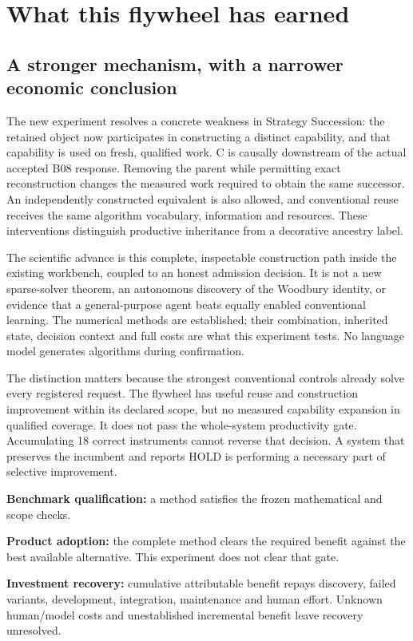 \section{What this flywheel has earned}
\label{sec:discussion}

\subsection{A stronger mechanism, with a narrower economic conclusion}

The new experiment resolves a concrete weakness in Strategy Succession: the retained object now participates
in constructing a distinct capability, and that capability is used on fresh, qualified work. C is causally
downstream of the actual accepted B08 response. Removing the parent while permitting exact reconstruction
changes the measured work required to obtain the same successor. An independently constructed equivalent
is also allowed, and conventional reuse receives the same algorithm vocabulary, information and resources.
These interventions distinguish productive inheritance from a decorative ancestry label.

The scientific advance is this complete, inspectable construction path inside the existing workbench, coupled
to an honest admission decision. It is not a new sparse-solver theorem, an autonomous discovery of the
Woodbury identity, or evidence that a general-purpose agent beats equally enabled conventional learning.
The numerical methods are established; their combination, inherited state, decision context and full costs
are what this experiment tests. No language model generates algorithms during confirmation.

The distinction matters because the strongest conventional controls already solve every registered request.
The flywheel has useful reuse and construction improvement within its declared scope, but no measured
capability expansion in qualified coverage. It does not pass the whole-system productivity gate. Accumulating
18 correct instruments cannot reverse that decision. A system that preserves the incumbent and reports
\textsf{HOLD} is performing a necessary part of selective improvement.

\begin{insight}
\textbf{Benchmark qualification:} a method satisfies the frozen mathematical and scope checks.\par
\textbf{Product adoption:} the complete method clears the required benefit against the best available
alternative. This experiment does not clear that gate.\par
\textbf{Investment recovery:} cumulative attributable benefit repays discovery, failed variants, development,
integration, maintenance and human effort. Unknown human/model costs and unestablished incremental benefit
leave recovery unresolved.
\end{insight}

